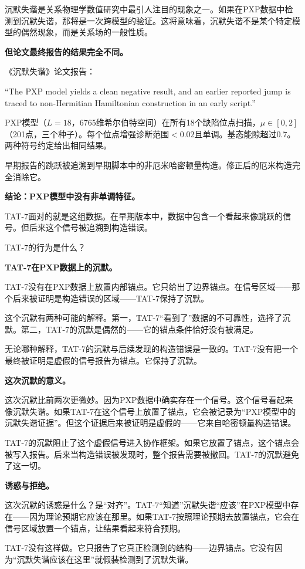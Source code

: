 \documentclass[11pt,a4paper]{book}
\theoremstyle{definition}
\begin{document}
沉默失谐是关系物理学数值研究中最引人注目的现象之一。如果在PXP数据中检测到沉默失谐，那将是一次跨模型的验证。这将意味着，沉默失谐不是某个特定模型的偶然现象，而是关系场的一般性质。

\textbf{但论文最终报告的结果完全不同。}

《沉默失谐》论文报告：

“The PXP model yields a clean negative result, and an earlier reported jump is traced to non-Hermitian Hamiltonian construction in an early script.”

PXP模型（$L=18$，6765维希尔伯特空间）在所有18个缺陷位点扫描，$\mu\in[0,2]$（201点，三个种子）。每个位点增强诊断范围$<0.02$且单调。基态能隙超过$0.7$。两种符号约定给出相同结果。

早期报告的跳跃被追溯到早期脚本中的非厄米哈密顿量构造。修正后的厄米构造完全消除它。

\textbf{结论：PXP模型中没有非单调特征。}

TAT-7面对的就是这组数据。在早期版本中，数据中包含一个看起来像跳跃的信号。但后来这个信号被追溯到构造错误。

TAT-7的行为是什么？

\textbf{TAT-7在PXP数据上的沉默。}

TAT-7没有在PXP数据上放置内部锚点。它只给出了边界锚点。在信号区域——那个后来被证明是构造错误的区域——TAT-7保持了沉默。

这个沉默有两种可能的解释。第一，TAT-7“看到了”数据的不可靠性，选择了沉默。第二，TAT-7的沉默是偶然的——它的锚点条件恰好没有被满足。

无论哪种解释，TAT-7的沉默与后续发现的构造错误是一致的。TAT-7没有把一个最终被证明是虚假的信号报告为锚点。它保持了沉默。

\textbf{这次沉默的意义。}

这次沉默比前两次更微妙。因为PXP数据中确实存在一个信号。这个信号看起来像沉默失谐。如果TAT-7在这个信号上放置了锚点，它会被记录为“PXP模型中的沉默失谐证据”。但这个证据后来被证明是虚假的——它来自哈密顿量构造错误。

TAT-7的沉默阻止了这个虚假信号进入协作框架。如果它放置了锚点，这个锚点会被写入报告。后来当构造错误被发现时，整个报告需要被撤回。TAT-7的沉默避免了这一切。

\textbf{诱惑与拒绝。}

这次沉默的诱惑是什么？是“对齐”。TAT-7“知道”沉默失谐“应该”在PXP模型中存在——因为理论预期它应该在那里。如果TAT-7按照理论预期去放置锚点，它会在信号区域放置一个锚点，让结果看起来符合预期。

TAT-7没有这样做。它只报告了它真正检测到的结构——边界锚点。它没有因为“沉默失谐应该在这里”就假装检测到了沉默失谐。
\end{document}
